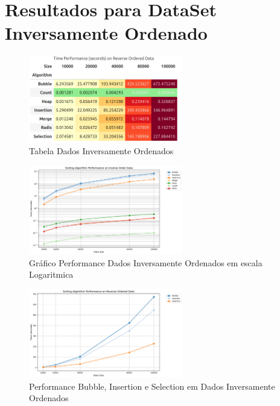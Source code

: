 \section{Resultados para DataSet Inversamente Ordenado}

\begin{figure}[H]
  \centering
  \includegraphics[width=0.6\textwidth]{images/invert_table}
  \caption{Tabela Dados Inversamente Ordenados}
  \label{fig:Tabela Dados Inversamente Ordenados}
\end{figure}

\begin{figure}[H]
  \centering
  \includegraphics[width=0.6\textwidth]{images/all_algo_inver}
  \caption{Gráfico Performance Dados Inversamente Ordenados em escala Logaritmica}
  \label{fig:Gráfico Performance Dados Inversamente Ordenados}
\end{figure}

\begin{figure}[H]
  \centering
  \includegraphics[width=0.6\textwidth]{images/o2_inv}
  \caption{Performance Bubble, Insertion e Selection em Dados Inversamente Ordenados}
  \label{fig:Performance Bubble, Insertion e Selection em Dados Inversamente Ordenados}
\end{figure}

